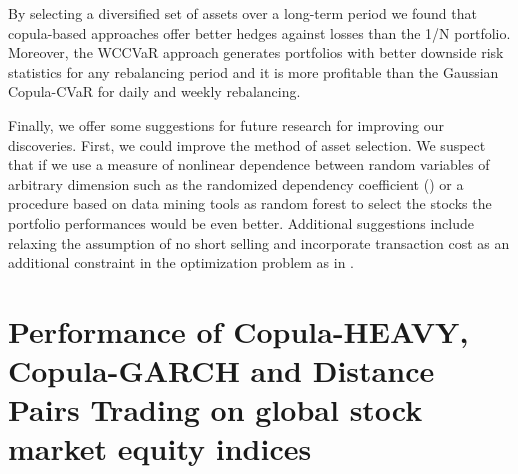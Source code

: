 \documentclass[a4paper,12pt]{report}
\begin{document}
By selecting a diversified set of assets over a long-term period we found that copula-based approaches offer better hedges against losses than the 1/N portfolio. Moreover, the WCCVaR approach generates portfolios with better downside risk statistics for any rebalancing period and it is more profitable than the Gaussian Copula-CVaR for daily and weekly rebalancing.

Finally, we offer some suggestions for future research for improving our discoveries. First, we could improve the method of asset selection. We suspect that if we use a measure of nonlinear dependence between random variables of arbitrary dimension such as the randomized dependency coefficient (\citet*{lopez2013randomized}) or a procedure based on data mining tools as random forest \citet*{dlrz10} to select the stocks the portfolio performances would be even better. 
Additional suggestions include relaxing the assumption of no short selling and incorporate transaction cost as an additional constraint in the optimization problem as in \citet*{krokhmal2002}.



\newpage


\chapter{Performance of Copula-HEAVY, Copula-GARCH and Distance Pairs Trading on global stock market equity indices}
\thispagestyle{myheadings}
\markright{}


\pagestyle{myheadings}
\markright{}


\end{document}
